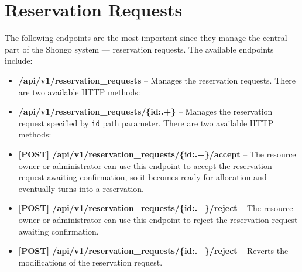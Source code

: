 \section{Reservation Requests}
The following endpoints are the most important since they manage the central part of the Shongo system --- reservation requests.
The available endpoints include:
\begin{itemize}
    \item \textbf{/api/v1/reservation\_requests} -- Manages the reservation requests. There are two available HTTP methods:
    \item \textbf{/api/v1/reservation\_requests/\{id:.+\}} -- Manages the reservation request specified by \texttt{id} path parameter. There are two available HTTP methods:
    \item \textbf{[POST] /api/v1/reservation\_requests/\{id:.+\}/accept} -- The resource owner or administrator can use this endpoint to accept the reservation request awaiting confirmation, so it becomes ready for allocation and eventually turns into a reservation.
    \item \textbf{[POST] /api/v1/reservation\_requests/\{id:.+\}/reject} -- The resource owner or administrator can use this endpoint to reject the reservation request awaiting confirmation.
    \item \textbf{[POST] /api/v1/reservation\_requests/\{id:.+\}/reject} -- Reverts the modifications of the reservation request.
\end{itemize}


